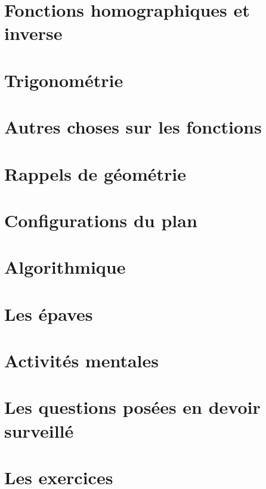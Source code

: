 \documentclass[a4paper,10pt]{book}
\begin{document}
\chapter{Fonctions homographiques et inverse}


\chapter{Trigonométrie}



\chapter{Autres choses sur les fonctions}


\chapter{Rappels de géométrie}


\chapter{Configurations du plan}


\chapter{Algorithmique}


\chapter{Les épaves}


\chapter{Activités mentales}


\chapter{Les questions posées en devoir surveillé}


\chapter{Les exercices}

\end{document}
